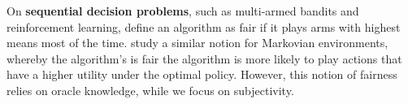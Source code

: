 



\ifdefined \longver On \textbf{sequential decision
  problems}, such as multi-armed bandits and reinforcement learning,
\citet{joseph:fair-bandits} define an algorithm as fair if it plays
arms with highest means most of the time. \citet{jabbari:fair-mdp}
study a similar notion for Markovian environments, whereby the
algorithm's is fair the algorithm is more likely to play actions that
have a higher utility under the optimal policy. However, this notion
of fairness relies on oracle knowledge, while we focus on
subjectivity.  \fi


